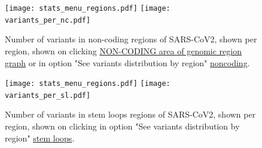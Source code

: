 \documentclass[a4paper, 10pt]{article}        %
\begin{document}
    \begin{figure}[!h]
     \centering
 \texttt{[image: stats\_menu\_regions.pdf]}
            \texttt{[image: variants\_per\_nc.pdf]}
     \caption{Number of variants in non-coding regions of SARS-CoV2, shown per region, shown on clicking \underline{NON-CODING area of genomic region graph} or in option "See variants distribution by region" {\color{blue}\underline{noncoding}}.
}
\label{fig:nc}
     \end{figure}
     
     
     
         \begin{figure}[!h]
     \centering
 \texttt{[image: stats\_menu\_regions.pdf]}
            \texttt{[image: variants\_per\_sl.pdf]}
     \caption{Number of variants in stem loops regions of SARS-CoV2, shown per region, shown on clicking in option "See variants distribution by region" {\color{blue}\underline{stem loops}}.
}
\label{fig:sl}
     \end{figure}
     
     
     
     
     
     
\newpage
\end{document}
